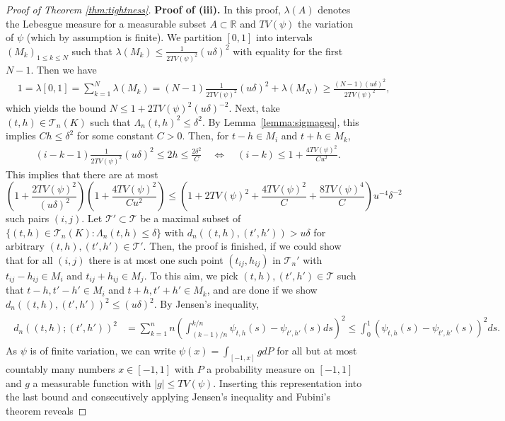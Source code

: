 \documentclass[10.5pt,letter]{article}
\numberwithin{equation}{section}
\theoremstyle{definition}
\newcommand{\R}{\mathbb{R}}
\newcommand{\1}{\mathbbm{1}}
\begin{document}
\begin{proof}[Proof of Theorem \ref{thm:tightness}]
    \textbf{Proof of (iii).} In this proof, $\lambda(A)$ denotes the Lebesgue measure for a measurable subset $A\subset\R$ and $TV(\psi)$ the variation of $\psi$ (which by assumption is finite). We partition $[0,1]$ into intervals $(M_k)_{1 \leq k \leq N}$ such that $\lambda(M_k) \leq \frac{1}{2TV(\psi)^2}  (u \delta)^2$ with equality for the first $N - 1$. 
    Then we have
    \begin{align*}
        &1= \lambda[0,1]= \sum_{k=1}^N \lambda(M_k) = (N-1) \frac{1}{2TV(\psi)^2} (u \delta)^2+ \lambda(M_N) \ge \frac{(N-1) (u \delta)^2 }{2 TV(\psi)^2},
    \end{align*}
    which yields the bound $N \leq 1+ 2TV(\psi)^2(u\delta)^{-2}$. Next, take $(t,h) \in \mathcal{T}_n(K)$ such that $\Lambda_n(t, h)^2\le \delta^2$. By Lemma~\ref{lemma:sigmageq}, this implies $Ch \leq \delta^2$ for some constant $C>0$. Then, for $t-h\in M_i$ and $t+h \in M_k$, 
    \begin{align*}
    &(i-k-1)\frac{1}{2TV(\psi)^2} (u\delta)^2 \leq 2h \leq \frac{2\delta^2}{C}  \quad  \Leftrightarrow \quad  (i-k)\leq 1 + \frac{4TV(\psi)^2}{Cu^2}.
    \end{align*}
    This implies that there are at most
    \[ \left(1+ \frac{2TV(\psi)^2}{(u\delta)^2} \right)\left( 1 + \frac{4TV(\psi)^2}{Cu^2}\right) \leq \left(1+2TV(\psi)^2+\frac{4TV(\psi)^2}{C}+\frac{8TV(\psi)^4}{C}\right)u^{-4}\delta^{-2} \]
    such pairs $(i,j)$. Let $\mathcal{T}' \subset \mathcal{T}$ be a maximal subset of $\{(t, h) \in \mathcal{T}_n (K): \Lambda_n (t, h) \leq \delta\}$ with $d_n((t, h), (t', h')) > u \delta$ for arbitrary $(t, h), (t', h') \in \mathcal{T}'$. Then, the proof is finished, if we could show that for all $(i, j)$ there is at most one such point $(t_{ij}, h_{ij})$ in $\mathcal{T}_n'$ with $t_{ij} - h_{ij} \in M_i$ and $t_{ij} + h_{ij} \in M_j$. To this aim, we pick $(t, h), (t', h') \in \mathcal{T}$ such that $t - h, t' - h' \in M_i$ and $t + h, t' + h' \in M_k$, and are done if we show $d_{n}((t, h), (t', h'))^2 \leq (u \delta)^2$. By Jensen's inequality,
    \begin{align*}\label{eq_proof:covering_numbers}
    \begin{split}
        d_n\left((t,h);(t',h')\right)^2   &= \sum_{k=1}^n n\left(\int_{(k-1)/n}^{k/n} \psi_{t,h}(s) - \psi_{t',h'}(s)ds\right)^2 \leq \int_0^1 \left(\psi_{t,h}(s)-\psi_{t',h'}(s)\right)^2ds.
        \end{split}
    \end{align*}
    As $\psi$ is of finite variation, we can write $\psi(x)=\int_{[-1,x]} gdP $ for all but at most countably many numbers $ x \in [-1,1]$ with $P$ a probability measure on $[-1,1]$ and $g$ a measurable function with $|g| \leq TV(\psi)$. Inserting this representation into the last bound and consecutively applying Jensen's inequality and Fubini's theorem reveals

\end{proof}
\end{document}
